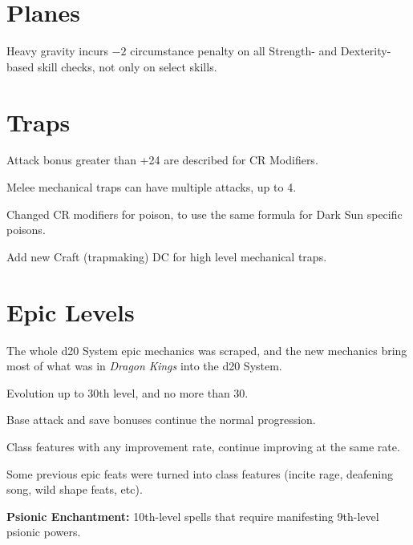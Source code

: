 \section{Planes}
Heavy gravity incurs $-2$ circumstance penalty on all Strength- and Dexterity-based skill checks, not only on select skills.

\section{Traps}
\begin{itemize*}
\item Attack bonus greater than +24 are described for CR Modifiers.
\item Melee mechanical traps can have multiple attacks, up to 4.
\item Changed CR modifiers for poison, to use the same formula for {\tableheader Dark Sun} specific poisons.
\item Add new Craft (trapmaking) DC for high level mechanical traps.
\end{itemize*}

\section{Epic Levels}
The whole d20 System epic mechanics was scraped, and the new mechanics bring most of what was in \emph{Dragon Kings} into the d20 System.

\begin{itemize*}
\item Evolution up to 30th level, and no more than 30.
\item Base attack and save bonuses continue the normal progression.
\item Class features with any improvement rate, continue improving at the same rate.
\item Some previous epic feats were turned into class features (incite rage, deafening song, wild shape feats, etc).
\item \textbf{Psionic Enchantment:} 10th-level spells that require manifesting 9th-level psionic powers.
\end{itemize*}
